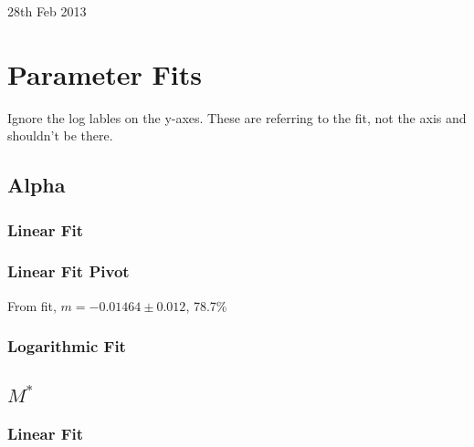 \documentclass[twocolumn]{article}
\begin{document}
\small{28th Feb 2013}
\section{Parameter Fits}
	Ignore the log lables on the y-axes. These are referring to the fit, not the axis and shouldn't be there.
	\subsection{Alpha}
		\subsubsection{Linear Fit}

		\begin{figure}[ht]
			\begin{center}
				\begingroup{}
	  			\resizebox{0.5\textwidth}{!}{%
					
	  			}\endgroup
			\end{center}
		\end{figure}

		\subsubsection{Linear Fit Pivot}
		\begin{figure}[ht]
			\begin{center}
				\begingroup{}
	  			\resizebox{0.5\textwidth}{!}{%
					
	  			}\endgroup
			\end{center}
		\end{figure}
		From fit, $m=-0.01464\pm 0.012$, 78.7\%

		\subsubsection{Logarithmic Fit}
		\begin{figure}[ht]
			\begin{center}
				\begingroup{}
	  			\resizebox{0.5\textwidth}{!}{%
					
	  			}\endgroup
			\end{center}
		\end{figure}

	\newpage
	\subsection{$M^{*}$}
		\subsubsection{Linear Fit}
		\begin{figure}[ht]
			\begin{center}
				\begingroup{}
	  			\resizebox{0.5\textwidth}{!}{%
					
	  			}\endgroup
			\end{center}
		\end{figure}
\end{document}
